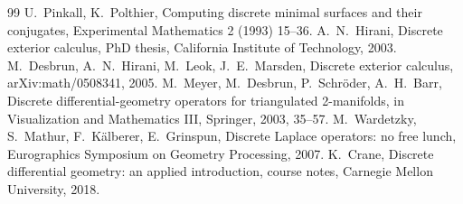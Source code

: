 \documentclass[10pt,a4paper]{article}
\theoremstyle{definition}
\begin{document}
\begin{thebibliography}{99}
 U.~Pinkall, K.~Polthier, Computing discrete minimal
  surfaces and their conjugates, Experimental Mathematics 2 (1993) 15--36.
 A.~N.~Hirani, Discrete exterior calculus, PhD thesis,
  California Institute of Technology, 2003.
 M.~Desbrun, A.~N.~Hirani, M.~Leok, J.~E.~Marsden, Discrete
  exterior calculus, arXiv:math/0508341, 2005.
 M.~Meyer, M.~Desbrun, P.~Schr\"oder, A.~H.~Barr, Discrete
  differential-geometry operators for triangulated 2-manifolds, in
  Visualization and Mathematics III, Springer, 2003, 35--57.
 M.~Wardetzky, S.~Mathur, F.~K\"alberer, E.~Grinspun,
  Discrete Laplace operators: no free lunch, Eurographics Symposium on
  Geometry Processing, 2007.
 K.~Crane, Discrete differential geometry: an applied
  introduction, course notes, Carnegie Mellon University, 2018.
\end{thebibliography}
\end{document}
